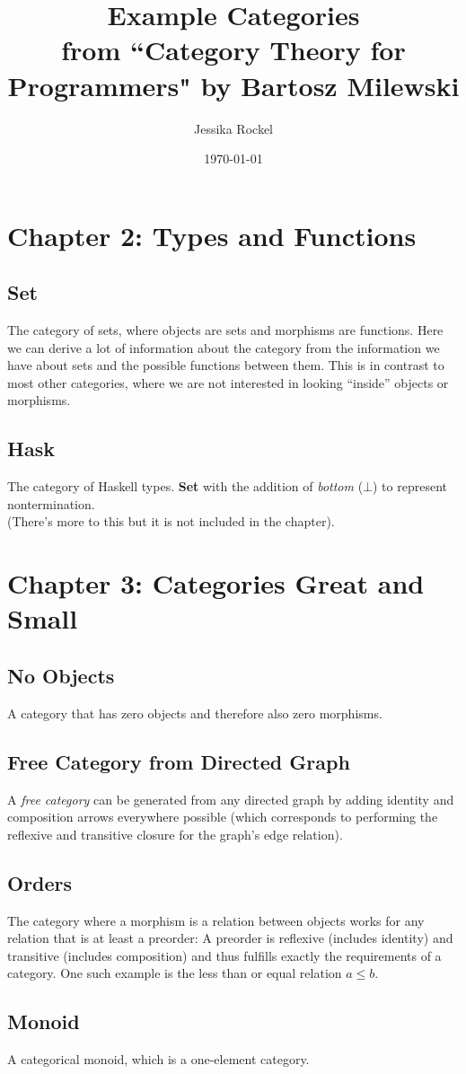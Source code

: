 \documentclass[12pt]{article}
\title{Example Categories\\
\large from ``Category Theory for Programmers" by  Bartosz Milewski}
\author{Jessika Rockel}
\date{\today}
\begin{document}
\maketitle

\section{Chapter 2: Types and Functions}
\subsection{Set}
The category of sets, where objects are sets and morphisms are functions. 
Here we can derive a lot of information about the category from the information we have about sets and the possible functions between them. 
This is in contrast to most other categories, where we are not interested in looking ``inside'' objects or morphisms.

\subsection{Hask}
The category of Haskell types. \textbf{Set} with the addition of \textit{bottom} ($\bot$) to represent nontermination. \\(There's more to this but it is not included in the chapter).

\section{Chapter 3: Categories Great and Small}
\subsection{No Objects}
A category that has zero objects and therefore also zero morphisms. 

\subsection{Free Category from Directed Graph}
A \textit{free category} can be generated from any directed graph by adding identity and composition arrows everywhere possible (which corresponds to performing the reflexive and transitive closure for the graph's edge relation).

\subsection{Orders}
The category where a morphism is a relation between objects works for any relation that is at least a preorder: A preorder is reflexive (includes identity) and transitive (includes composition) and thus fulfills exactly the requirements of a category. One such example is the less than or equal relation $a \leq b$.

\subsection{Monoid}
A categorical monoid, which is a one-element category. 
\end{document}
